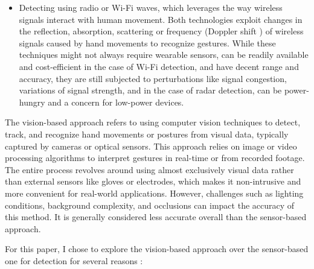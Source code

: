 \documentclass[12pt]{article}
\begin{document}
\begin{itemize}
    \item Detecting using radio or Wi-Fi waves, which leverages the way wireless signals interact with human movement. Both technologies exploit changes in the reflection, absorption, scattering or frequency (Doppler shift \cite{kim2016hand}) of wireless signals caused by hand movements to recognize gestures. While these techniques might not always require wearable sensors, can be readily available and cost-efficient in the case of Wi-Fi detection, and have decent range and accuracy, they are still subjected to perturbations like signal congestion, variations of signal strength, and in the case of radar detection, can be power-hungry and a concern for low-power devices.
  \end{itemize}

  The vision-based approach refers to using computer vision techniques to detect, track, and recognize hand movements or postures from visual data, typically captured by cameras or optical sensors. This approach relies on image or video processing algorithms to interpret gestures in real-time or from recorded footage. The entire process revolves around using almost exclusively visual data rather than external sensors like gloves or electrodes, which makes it non-intrusive and more convenient for real-world applications. However, challenges such as lighting conditions, background complexity, and occlusions can impact the accuracy of this method. It is generally considered less accurate overall than the sensor-based approach.

  For this paper, I chose to explore the vision-based approach over the sensor-based one for detection for several reasons :
\end{document}
